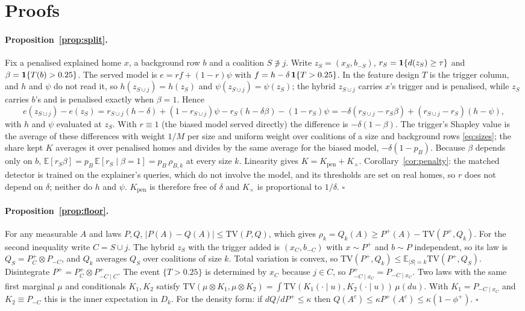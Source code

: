 \section{Proofs}\label{app:proofs}
\paragraph{Proposition~\ref{prop:split}.} Fix a penalised explained home $x$, a background row $b$ and a coalition
$S \not\ni j$. Write $z_S = (x_S, b_{-S})$, $r_S = \mathbf{1}\{d(z_S) \ge \tau\}$ and $\beta = \mathbf{1}\{T(b) > 0.25\}$. The served
model is $e = r f + (1-r)\psi$ with $f = h - \delta\,\mathbf{1}\{T > 0.25\}$. In the feature design $T$ is the trigger column,
and $h$ and $\psi$ do not read it, so $h(z_{S\cup j}) = h(z_S)$ and $\psi(z_{S\cup j}) = \psi(z_S)$; the hybrid
$z_{S\cup j}$ carries $x$'s trigger and is penalised, while $z_S$ carries $b$'s and is penalised exactly when
$\beta = 1$. Hence
\[
  e(z_{S\cup j}) - e(z_S) = r_{S\cup j}(h - \delta) + (1-r_{S\cup j})\psi - r_S(h - \delta\beta) - (1-r_S)\psi
  = -\delta(r_{S\cup j} - r_S\beta) + (r_{S\cup j} - r_S)(h - \psi),
\]
with $h$ and $\psi$ evaluated at $z_S$. With $r \equiv 1$ (the biased model served directly) the difference is
$-\delta(1-\beta)$. The trigger's Shapley value is the average of these differences with weight $1/M$ per size and
uniform weight over coalitions of a size and background rows \eqref{eq:sizes}; the share kept $K$ averages it over
penalised homes and divides by the same average for the biased model, $-\delta(1-p_B)$. Because $\beta$ depends only on
$b$, $\mathbb{E}[r_S\beta] = p_B\,\mathbb{E}[r_S \mid \beta = 1] = p_B\,\rho_{B,k}$ at every size $k$. Linearity gives
$K = K_{\mathrm{pen}} + K_\times$. Corollary~\ref{cor:penalty}: the matched detector is trained on the explainer's
queries, which do not involve the model, and its thresholds are set on real homes, so $r$ does not depend on $\delta$;
neither do $h$ and $\psi$. $K_{\mathrm{pen}}$ is therefore free of $\delta$ and $K_\times$ is proportional to $1/\delta$.
\hfill$\square$

\paragraph{Proposition~\ref{prop:floor}.} For any measurable $A$ and laws $P, Q$, $|P(A) - Q(A)| \le \mathrm{TV}(P,Q)$,
which gives $\rho_k = Q_k(A) \ge P^+(A) - \mathrm{TV}(P^+, Q_k)$. For the second inequality write $C = S \cup j$.
The hybrid $z_S$ with the trigger added is $(x_C, b_{-C})$ with $x \sim P^+$ and $b \sim P$ independent, so its law is
$Q_S = P^+_C \otimes P_{-C}$, and $Q_k$ averages $Q_S$ over coalitions of size $k$. Total variation is convex, so
$\mathrm{TV}(P^+, Q_k) \le \mathbb{E}_{|S|=k}\mathrm{TV}(P^+, Q_S)$. Disintegrate $P^+ = P^+_C \otimes P^+_{-C\mid C}$.
The event $\{T > 0.25\}$ is determined by $x_C$ because $j \in C$, so $P^+_{-C\mid x_C} = P_{-C\mid x_C}$. Two laws with
the same first marginal $\mu$ and conditionals $K_1, K_2$ satisfy $\mathrm{TV}(\mu\otimes K_1, \mu\otimes K_2) =
\int \mathrm{TV}(K_1(\cdot\mid u), K_2(\cdot\mid u))\,\mu(du)$. With $K_1 = P_{-C\mid x_C}$ and $K_2 \equiv P_{-C}$
this is the inner expectation in $D_k$. For the density form: if $dQ/dP^+ \le \kappa$ then $Q(A^c) \le
\kappa P^+(A^c) \le \kappa(1-\phi^+)$. \hfill$\square$
